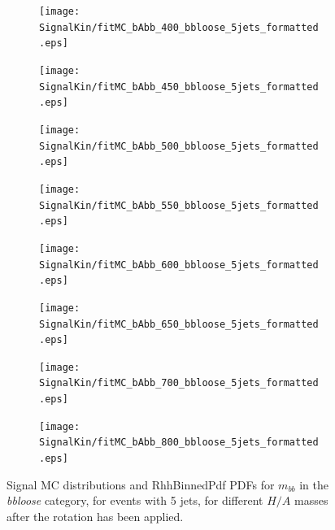 \begin{figure}[phtb!]
  \begin{center}
  \begin{subfigure}[$m_{A}=400$ GeV]{0.4\textwidth}\texttt{[image: SignalKin/fitMC\_bAbb\_400\_bbloose\_5jets\_formatted.eps]}\end{subfigure}
  \begin{subfigure}[$m_{A}=450$ GeV]{0.4\textwidth}\texttt{[image: SignalKin/fitMC\_bAbb\_450\_bbloose\_5jets\_formatted.eps]}\end{subfigure}
  \begin{subfigure}[$m_{A}=500$ GeV]{0.4\textwidth}\texttt{[image: SignalKin/fitMC\_bAbb\_500\_bbloose\_5jets\_formatted.eps]}\end{subfigure}
  \begin{subfigure}[$m_{A}=550$ GeV]{0.4\textwidth}\texttt{[image: SignalKin/fitMC\_bAbb\_550\_bbloose\_5jets\_formatted.eps]}\end{subfigure}
  \begin{subfigure}[$m_{A}=600$ GeV]{0.4\textwidth}\texttt{[image: SignalKin/fitMC\_bAbb\_600\_bbloose\_5jets\_formatted.eps]}\end{subfigure}
  \begin{subfigure}[$m_{A}=650$ GeV]{0.4\textwidth}\texttt{[image: SignalKin/fitMC\_bAbb\_650\_bbloose\_5jets\_formatted.eps]}\end{subfigure}
  \begin{subfigure}[$m_{A}=700$ GeV]{0.4\textwidth}\texttt{[image: SignalKin/fitMC\_bAbb\_700\_bbloose\_5jets\_formatted.eps]}\end{subfigure}
  \begin{subfigure}[$m_{A}=800$ GeV]{0.4\textwidth}\texttt{[image: SignalKin/fitMC\_bAbb\_800\_bbloose\_5jets\_formatted.eps]}\end{subfigure}
  \caption{Signal MC distributions and RhhBinnedPdf PDFs for $m_{bb}$ in the {\it bbloose} category, for events with 5 jets, for different $H/A$ masses after the rotation has been applied.\label{fig:signalPDFs_5j_bbloose}} 
    \end{center}
\end{figure}



